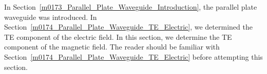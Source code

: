 

\label{m0175_Parallel_Plate_Waveguide_TE_Magnetic} %

In Section~\ref{m0173_Parallel_Plate_Waveguide_Introduction}, the parallel plate waveguide was introduced.
In Section~\ref{m0174_Parallel_Plate_Waveguide_TE_Electric}, we determined the TE component of the electric field.
In this section, we determine the TE component of the magnetic field.
The reader should be familiar with Section~\ref{m0174_Parallel_Plate_Waveguide_TE_Electric} before attempting this section.

